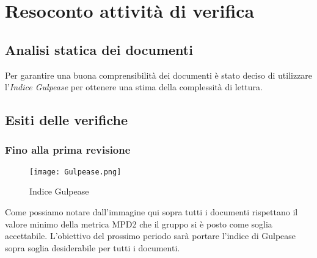 \chapter{Resoconto attività di verifica}
\section{Analisi statica dei documenti}
Per garantire una buona comprensibilità dei documenti è stato deciso di utilizzare l'\textit{Indice Gulpease} per ottenere una stima della complessità di lettura.
\section{Esiti delle verifiche}
    \subsection{Fino alla prima revisione}
    \begin{figure}[h!]
        \centering
        \texttt{[image: Gulpease.png]}
        \caption{Indice Gulpease}
    \end{figure}
    Come possiamo notare dall'immagine qui sopra tutti i documenti rispettano il valore minimo della metrica MPD2 che il gruppo si è posto come soglia accettabile. L'obiettivo del prossimo periodo sarà portare l'indice di Gulpease sopra soglia desiderabile per tutti i documenti. 
